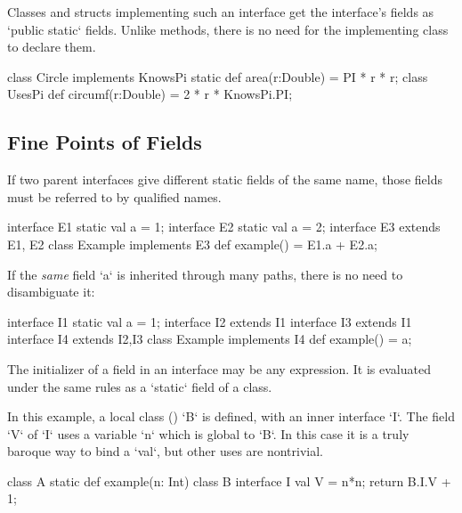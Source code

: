 Classes and structs implementing such an interface get the interface's fields as
\xcd`public static` fields.  Unlike  methods, there is no need
for the implementing class to declare them. 
\begin{xten}
class Circle implements KnowsPi {
  static def area(r:Double) = PI * r * r;
}
class UsesPi {
  def circumf(r:Double) = 2 * r * KnowsPi.PI;
}
\end{xten}
%

\subsection{Fine Points of Fields}

If two parent interfaces give different static fields of the same name, 
those fields must be referred to by qualified names.
% 
\begin{xten}
interface E1 {static val a = 1;}
interface E2 {static val a = 2;}
interface E3 extends E1, E2{}
class Example implements E3 {
  def example() = E1.a + E2.a;
}
\end{xten}
%

If the {\em same} field \xcd`a` is inherited through many paths, there is no need to
disambiguate it:
\begin{xten}
interface I1 { static val a = 1;} 
interface I2 extends I1 {}
interface I3 extends I1 {}
interface I4 extends I2,I3 {}
class Example implements I4 {
  def example() = a;
}
\end{xten}
%

The initializer of a field in an interface may be any expression.  It is
evaluated under the same rules as a \xcd`static` field of a class. 

\begin{ex}
In this example, a local class () \xcd`B` is defined,
with an inner interface \xcd`I`.  The field \xcd`V` of \xcd`I` uses a variable
\xcd`n` which is global to \xcd`B`.   In this case it is a truly baroque way
to bind a \xcd`val`, but other uses are nontrivial.

\begin{xten}
class A {
  static def example(n: Int) {
    class B {
      interface I { val V = n*n; }
    }
   return B.I.V + 1;
  }
}
\end{xten}
\end{ex}

